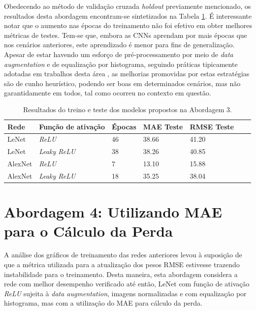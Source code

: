 	Obedecendo ao método de validação cruzada \emph{holdout} previamente mencionado, os resultados desta abordagem encontram-se sintetizados na Tabela \ref{tab:results-3}. É interessante notar que o aumento nas épocas do treinamento não foi efetivo em obter melhores métricas de testes. Tem-se que, embora as CNNs aprendam por mais épocas que nos cenários anteriores, este aprendizado é menor para fins de generalização. Apesar de estar havendo um esforço de pré-processamento por meio de \emph{data augmentation} e de equalização por histograma, seguindo práticas tipicamente adotadas em trabalhos desta área \cite{chollet2017deep}, as melhorias promovidas por estas estratégias são de cunho heurístico, podendo ser boas em determinados cenários, mas não garantidamente em todos, tal como ocorreu no contexto em questão.

	\begin{table}[!ht]
		\caption{Resultados do treino e teste dos modelos propostos na Abordagem 3.}
		\label{tab:results-3}
		\centering
		\begin{tabular}{l l l l l l l}
				\toprule
				Rede & Função de ativação & Épocas & MAE Teste & RMSE Teste \\
				\midrule
				LeNet & \emph{ReLU} & 46 &  38.66 & 41.20 \\
				LeNet & \emph{Leaky ReLU} &  38 & 38.26 & 40.85 \\
				AlexNet & \emph{ReLU} & 7 & 13.10 & 15.88 \\
				AlexNet & \emph{Leaky ReLU} & 18 & 35.25 & 38.04 \\
				\bottomrule
			\end{tabular}
	\end{table}

\section{Abordagem 4: Utilizando MAE para o Cálculo da Perda}%
	A análise dos gráficos de treinamento das redes anteriores levou à suposição de que a métrica utilizada para a atualização dos pesos RMSE estivesse trazendo instabilidade para o treinamento. Desta maneira, esta abordagem considera a rede com melhor desempenho verificado até então, LeNet com função de ativação \emph{ReLU}  sujeita à \emph{data augmentation}, imagens normalizadas e com equalização por histograma, mas com a  utilização do MAE para cálculo da perda.


